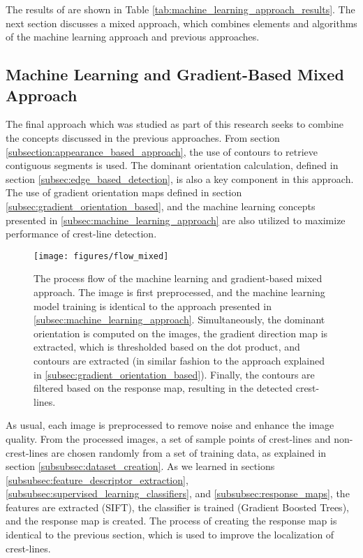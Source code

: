 The results of are shown in Table \ref{tab:machine_learning_approach_results}. The next section discusses a mixed approach, which combines elements and algorithms of the machine learning approach and previous approaches.



\subsection{Machine Learning and Gradient-Based Mixed Approach}\label{subsec:mixed_ml_gradient_approach}

The final approach which was studied as part of this research seeks to combine the concepts discussed in the previous approaches. From section \ref{subsection:appearance_based_approach}, the use of contours to retrieve contiguous segments is used. The dominant orientation calculation, defined in section \ref{subsec:edge_based_detection}, is also a key component in this approach. The use of gradient orientation maps defined in section \ref{subsec:gradient_orientation_based}, and the machine learning concepts presented in \ref{subsec:machine_learning_approach} are also utilized to maximize performance of crest-line detection.

\begin{figure}[H]
	\centering
	\texttt{[image: figures/flow\_mixed]}
	\caption{The process flow of the machine learning and gradient-based mixed approach. The image is first preprocessed, and the machine learning model training is identical to the approach presented in \ref{subsec:machine_learning_approach}. Simultaneously, the dominant orientation is computed on the images, the gradient direction map is extracted, which is thresholded based on the dot product, and contours are extracted (in similar fashion to the approach explained in \ref{subsec:gradient_orientation_based}). Finally, the contours are filtered based on the response map, resulting in the detected crest-lines. }
	\label{fig:flow_mixed}
\end{figure}

As usual, each image is preprocessed to remove noise and enhance the image quality. From the processed images, a set of sample points of crest-lines and non-crest-lines are chosen randomly from a set of training data, as explained in section \ref{subsubsec:dataset_creation}. As we learned in sections \ref{subsubsec:feature_descriptor_extraction}, \ref{subsubsec:supervised_learning_classifiers}, and \ref{subsubsec:response_maps}, the features are extracted (SIFT), the classifier is trained (Gradient Boosted Trees), and the response map is created. The process of creating the response map is identical to the previous section, which is used to improve the localization of crest-lines.

